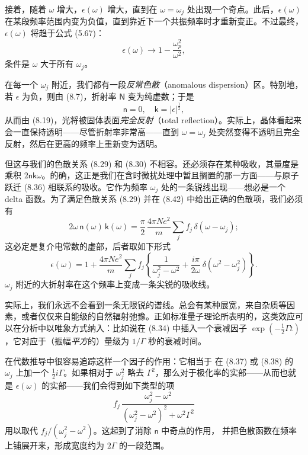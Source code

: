 接着，随着 $\omega$ 增大，$\epsilon(\omega)$ 增大，直到在 $\omega = \omega_j$ 处出现一个奇点。此后，$\epsilon(\omega)$ 在某段频率范围内变为负值，直到靠近下一个共振频率时才重新变正。不过最终，$\epsilon(\omega)$ 将趋于公式 (5.67)：
\begin{equation*}
\epsilon(\omega) \to 1 - \frac{\omega_p^2}{\omega^2},\tag{8.45}
\end{equation*}
条件是 $\omega$ 大于所有 $\omega_j$。

在每一个 $\omega_j$ 附近，我们都有一段\emph{反常色散}（anomalous dispersion）区。特别地，若 $\epsilon$ 为负，则由 (8.7)，折射率 $\mathsf{N}$ 变为纯虚数；于是
\begin{equation*}
\mathsf{n} = 0,\quad \mathsf{k} = |\epsilon|^{\frac{1}{2}},\tag{8.46}
\end{equation*}
从而由 (8.19)，光将被固体表面\emph{完全反射}（total reflection）。实际上，晶体看起来会一直保持透明——尽管折射率非常高——直到 $\omega = \omega_j$ 处突然变得不透明且完全反射，然后在更高的频率上重新变为透明。

但这与我们的色散关系 (8.29) 和 (8.30) 不相容。还必须存在某种吸收，其量度是乘积 $2\mathsf{n}\mathsf{k}\omega$。的确，这正是我们在含时微扰处理中暂且搁置的那一方面——与原子跃迁 (8.36) 相联系的吸收。它作为频率 $\omega_j$ 处的一条锐线出现——想必是一个 delta 函数。为了满足色散关系 (8.29) 并在 (8.42) 中给出正确的色散项，我们必须有
\begin{equation*}
2\omega\,\mathsf{n}(\omega)\,\mathsf{k}(\omega) = \frac{\pi}{2}\,\frac{4\pi N e^2}{m}\sum_j f_j\,\delta(\omega-\omega_j);\tag{8.47}
\end{equation*}
这必定是复介电常数的虚部，后者取如下形式
\begin{equation*}
\epsilon(\omega) = 1 + \frac{4\pi N e^2}{m}\sum_j f_j\left\{\frac{1}{\omega_j^2-\omega^2} + \frac{i\pi}{2\omega}\,\delta(\omega^2-\omega_j^2)\right\}.\tag{8.48}
\end{equation*}
$\omega_j$ 附近的大折射率在这个频率上变成一条尖锐的吸收线。

实际上，我们永远不会看到一条无限锐的谱线。总会有某种展宽，来自杂质等因素，或者仅仅来自能级的自然辐射弛豫。正如标准量子理论所表明的，这类效应可以在分析中以唯象方式纳入：比如说在 (8.34) 中插入一个衰减因子 $\exp(-\frac{1}{2}\Gamma t)$，它对应于（振幅\emph{平方}的）量级为 $1/\Gamma$ 秒的衰减时间。

在代数推导中很容易追踪这样一个因子的作用：它相当于
在 (8.37) 或 (8.38) 的 $\omega_j$ 上加一个 $\frac{1}{2}i\Gamma$。如果相对于 $\omega_j^2$ 略去 $\Gamma^2$，那么对于极化率的实部——从而也就是 $\epsilon(\omega)$ 的实部——我们会得到如下类型的项
\begin{equation*}
f_j\,\frac{\omega_j^2-\omega^2}{(\omega_j^2-\omega^2)^2+\omega^2\Gamma^2}\tag{8.49}
\end{equation*}
用以取代 $f_j/(\omega_j^2-\omega^2)$。这起到了消除 $\mathsf{n}$ 中奇点的作用，
并把色散函数在频率上铺展开来，形成宽度约为 $2\Gamma$ 的一段范围。

